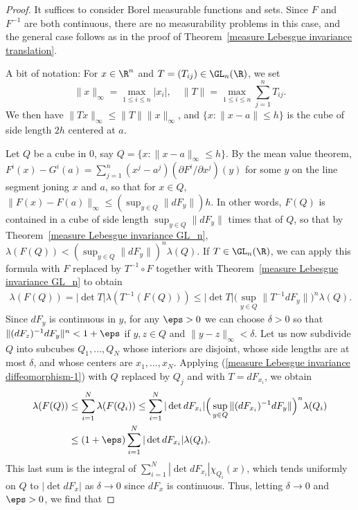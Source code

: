 \begin{proof}
It suffices to consider Borel measurable functions and sets. Since $F$ and
$F^{-1}$ are both continuous, there are no measurability problems in this case, and the general case follows as in the proof of Theorem~\ref{measure Lebesgue invariance translation}.\par
A bit of notation: For $x\in\R^n$ and $T=(T_{ij})\in\GL_n(\R)$, we set
\[\|x\|_{\infty}=\max_{1\leq i\leq n}|x_i|,\quad\|T\|=\max_{1\leq i\leq n}\sum_{j=1}^{n}T_{ij}.\]
We then have $\|Tx\|_{\infty}\leq\|T\|\|x\|_{\infty}$, and $\{x:\|x-a\|\leq h\}$ is the cube of side length $2h$ centered at $a$.\par
Let $Q$ be a cube in $0$, say $Q=\{x:\|x-a\|_{\infty}\leq h\}$. By the mean value theorem, $F^i(x)-G^i(a)=\sum_{j=1}^{n}(x^j-a^j)(\partial F^i/\partial x^j)(y)$ for some $y$ on the line segment joning $x$ and $a$, so that for $x\in Q$, $\|F(x)-F(a)\|_{\infty}\leq(\sup_{y\in Q}\|dF_y\|)h$. In other words, $F(Q)$ is contained in a cube of side length $\sup_{y\in Q}\|dF_y\|$ times that of $Q$, so that by Theorem~\ref{measure Lebesgue invariance GL_n}, $\lambda(F(Q))<(\sup_{y\in Q}\|dF_y\|)^n\lambda(Q)$. If $T\in\GL_n(\R)$, we can apply this formula with $F$ replaced by $T^{-1}\circ F$ together with Theorem~\ref{measure Lebesgue invariance GL_n} to obtain
\begin{align}\label{measure Lebesgue invariance diffeomorphism-1}
\lambda(F(Q))=|\det T|\lambda(T^{-1}(F(Q)))\leq|\det T|\Big(\sup_{y\in Q}\|T^{-1}dF_y\|\Big)^n\lambda(Q).
\end{align}
Since $dF_y$ is continuous in $y$, for any $\eps>0$ we can choose $\delta>0$ so that $\|(dF_z)^{-1}dF_y\|^n<1+\eps$ if $y,z\in Q$ and $\|y-z\|_{\infty}<\delta$. Let us now subdivide $Q$ into subcubes $Q_1,\dots,Q_N$ whose interiors are disjoint, whose side lengths are at most $\delta$, and whose centers are $x_1,\dots,x_N$. Applying (\ref{measure Lebesgue invariance diffeomorphism-1}) with $Q$ replaced by $Q_j$ and with $T=dF_{x_i}$, we obtain
\begin{align*}
\lambda(F(Q))&\leq\sum_{i=1}^{N}\lambda(F(Q_i))\leq\sum_{i=1}^{N}|\det dF_{x_i}|\Big(\sup_{y\in Q}\|(dF_{x_i})^{-1}dF_y\|\Big)^n\lambda(Q_i)\\
&\leq(1+\eps)\sum_{i=1}^{N}|\det dF_{x_i}|\lambda(Q_i).
\end{align*}
This last sum is the integral of $\sum_{i=1}^{N}|\det dF_{x_i}|\chi_{Q_i}(x)$, which tends uniformly on $Q$ to $|\det dF_x|$ as $\delta\to 0$ since $dF_x$ is continuous. Thus, letting $\delta\to 0$ and $\eps>0$, we find that

\end{proof}
